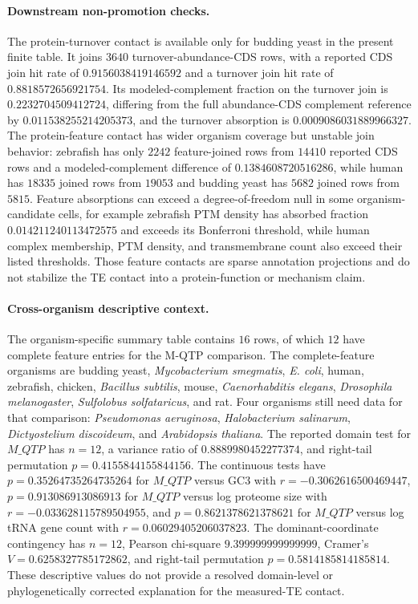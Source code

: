 \paragraph{Downstream non-promotion checks.}
The protein-turnover contact is available only for budding yeast in the present finite table.  It joins $3640$ turnover-abundance-CDS rows, with a reported CDS join hit rate of $0.9156038419146592$ and a turnover join hit rate of $0.8818572656921754$.  Its modeled-complement fraction on the turnover join is $0.2232704509412724$, differing from the full abundance-CDS complement reference by $0.011538255214205373$, and the turnover absorption is $0.0009086031889966327$.  The protein-feature contact has wider organism coverage but unstable join behavior: zebrafish has only $2242$ feature-joined rows from $14410$ reported CDS rows and a modeled-complement difference of $0.1384608720516286$, while human has $18335$ joined rows from $19053$ and budding yeast has $5682$ joined rows from $5815$.  Feature absorptions can exceed a degree-of-freedom null in some organism-candidate cells, for example zebrafish PTM density has absorbed fraction $0.014211240113472575$ and exceeds its Bonferroni threshold, while human complex membership, PTM density, and transmembrane count also exceed their listed thresholds.  Those feature contacts are sparse annotation projections and do not stabilize the TE contact into a protein-function or mechanism claim.

\paragraph{Cross-organism descriptive context.}
The organism-specific summary table contains $16$ rows, of which $12$ have complete feature entries for the M-QTP comparison.  The complete-feature organisms are budding yeast, \emph{Mycobacterium smegmatis}, \emph{E. coli}, human, zebrafish, chicken, \emph{Bacillus subtilis}, mouse, \emph{Caenorhabditis elegans}, \emph{Drosophila melanogaster}, \emph{Sulfolobus solfataricus}, and rat.  Four organisms still need data for that comparison: \emph{Pseudomonas aeruginosa}, \emph{Halobacterium salinarum}, \emph{Dictyostelium discoideum}, and \emph{Arabidopsis thaliana}.  The reported domain test for $M\_{QTP}$ has $n=12$, a variance ratio of $0.8889980452277374$, and right-tail permutation $p=0.4155844155844156$.  The continuous tests have $p=0.35264735264735264$ for $M\_{QTP}$ versus GC3 with $r=-0.3062616500469447$, $p=0.913086913086913$ for $M\_{QTP}$ versus log proteome size with $r=-0.033628115789504955$, and $p=0.8621378621378621$ for $M\_{QTP}$ versus log tRNA gene count with $r=0.06029405206037823$.  The dominant-coordinate contingency has $n=12$, Pearson chi-square $9.399999999999999$, Cramer's $V=0.6258327785172862$, and right-tail permutation $p=0.5814185814185814$.  These descriptive values do not provide a resolved domain-level or phylogenetically corrected explanation for the measured-TE contact.

